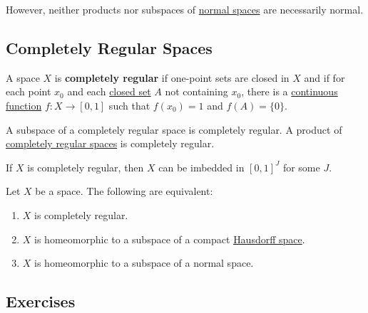   However, neither products nor subspaces of \hyperref[def:normal-spaces]{normal spaces} are necessarily normal. 

\subsection{Completely Regular Spaces}

  \begin{definition}
    \label{def:completely-regular-spaces}
    A space $X$ is \textbf{completely regular} if one-point sets are closed in $X$ and if for each point $x_0$ and each \hyperref[def:closed]{closed set} $A$ not containing $x_0$, there is a \hyperref[def:continuous_func]{continuous function} $f: X \to [0,1]$ such that $f(x_0) = 1$ and $f(A) = \{0\}$. 
  \end{definition}

  \begin{theorem}
    \label{thm:subspaces-and-products-of-completely-regular}
    A subspace of a completely regular space is completely regular. A product of \hyperref[def:completely-regular-spaces]{completely regular spaces} is completely regular. 
  \end{theorem}

  \begin{theorem}
    \label{thm:embedding-a-completely-regular-space-in-a-cube}
    If $X$ is completely regular, then $X$ can be imbedded in $[0,1]^J$ for some $J$. 
  \end{theorem}

  \begin{corollary}
    \label{thm:characterizations-of-complete-regularity}
    Let $X$ be a space. The following are equivalent: 
    \begin{enumerate}
      \item $X$ is completely regular. 
      \item $X$ is homeomorphic to a subspace of a compact \hyperref[def:hausdorff-space]{Hausdorff space}. 
      \item $X$ is homeomorphic to a subspace of a normal space. 
    \end{enumerate}
  \end{corollary}

  \subsection{Exercises}
